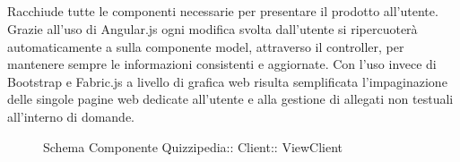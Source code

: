 \subsection{}
Racchiude tutte le componenti necessarie per presentare il prodotto all'utente.
Grazie all'uso di Angular.js ogni modifica svolta dall'utente si ripercuoterà automaticamente a sulla componente model, attraverso il controller, per mantenere sempre le informazioni consistenti e aggiornate.
Con l'uso invece di Bootstrap e Fabric.js a livello di grafica web risulta semplificata l'impaginazione delle singole pagine web dedicate all'utente e alla gestione di allegati non testuali all'interno di domande.
\begin{figure}[H]
\centering
\noindent{}
\caption[Schema Componente Quizzipedia::Client::ViewClient]{Schema Componente Quizzipedia:: Client:: ViewClient}
\end{figure}
